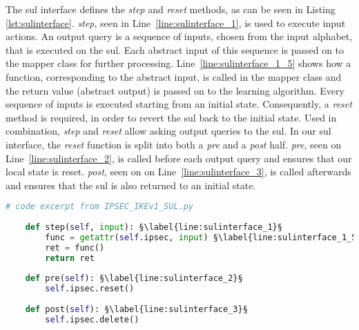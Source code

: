 \newpage
The \ac{sul} interface defines the \emph{step} and \emph{reset} methods, as can be seen in Listing \ref{lst:sulinterface}. \emph{step}, seen in Line~\ref{line:sulinterface_1}, is used to execute input actions. An output query is a sequence of inputs, chosen from the input alphabet, that is executed on the \ac{sul}. Each abstract input of this sequence is passed on to the mapper class for further processing. Line~\ref{line:sulinterface_1_5} shows how a function, corresponding to the abstract input, is called in the mapper class and the return value (abstract output) is passed on to the learning algorithm. Every sequence of inputs is executed starting from an initial state. Consequently, a \emph{reset} method is required, in order to revert the \ac{sul} back to the initial state. Used in combination, \emph{step} and \emph{reset} allow asking output queries to the \ac{sul}. In our \ac{sul} interface, the \emph{reset} function is split into both a \emph{pre} and a \emph{post} half. \emph{pre}, seen on Line~\ref{line:sulinterface_2}, is called before each output query and ensures that our local state is reset. \emph{post}, seen on on Line~\ref{line:sulinterface_3}, is called afterwards and ensures that the \ac{sul} is also returned to an initial state. \\

\begin{lstlisting}[float=h, caption=SUL interface methods code excerpt., label=lst:sulinterface, language=python, escapechar=§]
	# code excerpt from IPSEC_IKEv1_SUL.py
	
	def step(self, input): §\label{line:sulinterface_1}§
		func = getattr(self.ipsec, input) §\label{line:sulinterface_1_5}§
		ret = func()
		return ret
	
	def pre(self): §\label{line:sulinterface_2}§
		self.ipsec.reset()
	
	def post(self): §\label{line:sulinterface_3}§
		self.ipsec.delete()
\end{lstlisting}

